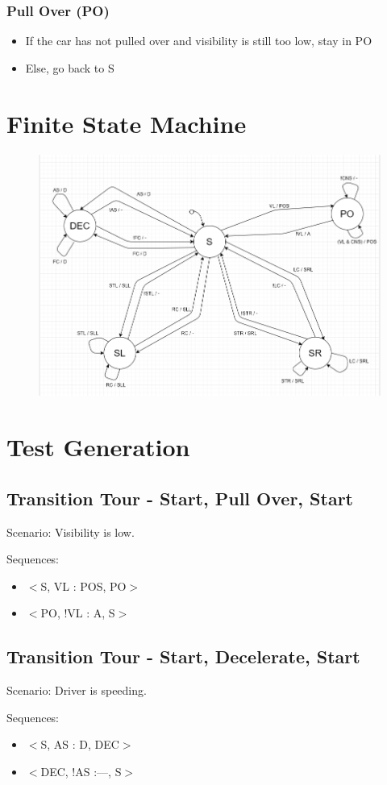 \documentclass[10pt,letterpaper]{article}
\begin{document}
\subsubsection{Pull Over (PO)}
\begin{itemize}
	\item{If the car has not pulled over and visibility is still too low, stay in PO}
	\item{Else, go back to S}
\end{itemize}

\newpage
\section{Finite State Machine}
\begin{figure}[h]
	\centerline{\includegraphics[width=20cm]{fsm.png}}
\end{figure}

\newpage
\section{Test Generation}
\subsection{Transition Tour - Start, Pull Over, Start}
Scenario: Visibility is low.

Sequences:
\begin{itemize}
	\item{$<$S, VL : POS, PO$>$}
	\item{$<$PO, !VL : A, S$>$}
\end{itemize}

\subsection{Transition Tour - Start, Decelerate, Start}
Scenario: Driver is speeding.

Sequences:
\begin{itemize}
	\item{$<$S, AS : D, DEC$>$}
	\item{$<$DEC, !AS :—, S$>$}
\end{itemize}
\end{document}
